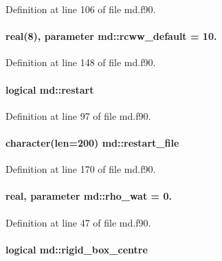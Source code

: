 Definition at line 106 of file md.\-f90.

\hypertarget{classmd_a2f872843dc2ee5af7a22d0e7e7314118}{
\paragraph[{rcww\-\_\-default}]{\setlength{\rightskip}{0pt plus 5cm}real(8), parameter md\-::rcww\-\_\-default = 10.}}\label{classmd_a2f872843dc2ee5af7a22d0e7e7314118}


Definition at line 148 of file md.\-f90.

\hypertarget{classmd_a5e065ccb1c0bcd84e07c0033b0dbac53}{
\paragraph[{restart}]{\setlength{\rightskip}{0pt plus 5cm}logical md\-::restart}}\label{classmd_a5e065ccb1c0bcd84e07c0033b0dbac53}


Definition at line 97 of file md.\-f90.

\hypertarget{classmd_acd9f403feb8f8c8f25d3f37b37260d4b}{
\paragraph[{restart\-\_\-file}]{\setlength{\rightskip}{0pt plus 5cm}character(len=200) md\-::restart\-\_\-file}}\label{classmd_acd9f403feb8f8c8f25d3f37b37260d4b}


Definition at line 170 of file md.\-f90.

\hypertarget{classmd_a140121ec92e7b43f4414f496ad1eccda}{
\paragraph[{rho\-\_\-wat}]{\setlength{\rightskip}{0pt plus 5cm}real, parameter md\-::rho\-\_\-wat = 0.}}\label{classmd_a140121ec92e7b43f4414f496ad1eccda}


Definition at line 47 of file md.\-f90.

\hypertarget{classmd_a195f305fc63ac9582e1dd9ae30587885}{
\paragraph[{rigid\-\_\-box\-\_\-centre}]{\setlength{\rightskip}{0pt plus 5cm}logical md\-::rigid\-\_\-box\-\_\-centre}}\label{classmd_a195f305fc63ac9582e1dd9ae30587885}


